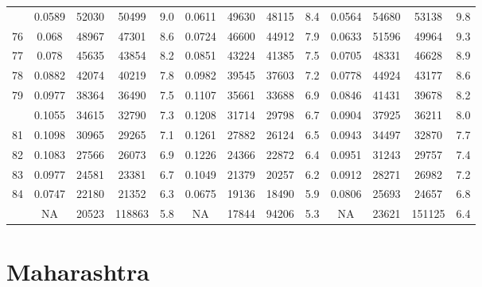 \documentclass[
  14pt,
]{article}
\begin{document}
\begin{longtable}[t]{lcccccccccccc}
\addlinespace
75 & 0.0589 & 52030 & 50499 & 9.0 & 0.0611 & 49630 & 48115 & 8.4 & 0.0564 & 54680 & 53138 & 9.8\\
76 & 0.068 & 48967 & 47301 & 8.6 & 0.0724 & 46600 & 44912 & 7.9 & 0.0633 & 51596 & 49964 & 9.3\\
77 & 0.078 & 45635 & 43854 & 8.2 & 0.0851 & 43224 & 41385 & 7.5 & 0.0705 & 48331 & 46628 & 8.9\\
78 & 0.0882 & 42074 & 40219 & 7.8 & 0.0982 & 39545 & 37603 & 7.2 & 0.0778 & 44924 & 43177 & 8.6\\
79 & 0.0977 & 38364 & 36490 & 7.5 & 0.1107 & 35661 & 33688 & 6.9 & 0.0846 & 41431 & 39678 & 8.2\\
\addlinespace
80 & 0.1055 & 34615 & 32790 & 7.3 & 0.1208 & 31714 & 29798 & 6.7 & 0.0904 & 37925 & 36211 & 8.0\\
81 & 0.1098 & 30965 & 29265 & 7.1 & 0.1261 & 27882 & 26124 & 6.5 & 0.0943 & 34497 & 32870 & 7.7\\
82 & 0.1083 & 27566 & 26073 & 6.9 & 0.1226 & 24366 & 22872 & 6.4 & 0.0951 & 31243 & 29757 & 7.4\\
83 & 0.0977 & 24581 & 23381 & 6.7 & 0.1049 & 21379 & 20257 & 6.2 & 0.0912 & 28271 & 26982 & 7.2\\
84 & 0.0747 & 22180 & 21352 & 6.3 & 0.0675 & 19136 & 18490 & 5.9 & 0.0806 & 25693 & 24657 & 6.8\\
\addlinespace
85 & NA & 20523 & 118863 & 5.8 & NA & 17844 & 94206 & 5.3 & NA & 23621 & 151125 & 6.4\\*
\end{longtable}

\pagebreak

\hypertarget{maharashtra}{%
\section{Maharashtra}\label{maharashtra}}
\end{document}
